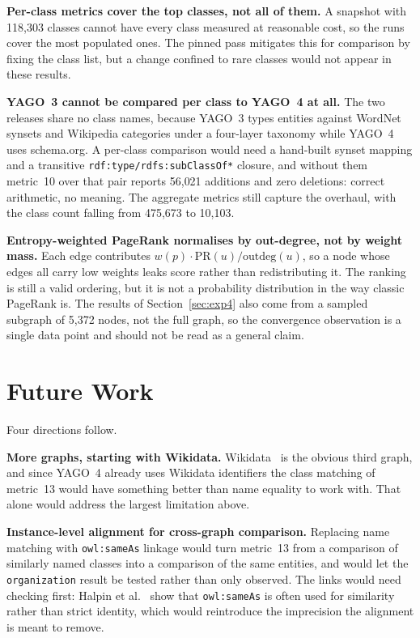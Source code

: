 \textbf{Per-class metrics cover the top classes, not all of them.} A snapshot
with 118{,}303 classes cannot have every class measured at reasonable cost, so
the runs cover the most populated ones. The pinned pass mitigates this for
comparison by fixing the class list, but a change confined to rare classes would
not appear in these results.

\textbf{YAGO~3 cannot be compared per class to YAGO~4 at all.} The two releases
share no class names, because YAGO~3 types entities against WordNet synsets and
Wikipedia categories under a four-layer taxonomy while YAGO~4 uses schema.org. A
per-class comparison would need a hand-built synset mapping and a transitive
\texttt{rdf:type/\allowbreak rdfs:subClassOf*} closure, and without them metric~10 over that
pair reports 56{,}021 additions and zero deletions: correct arithmetic, no
meaning. The aggregate metrics still capture the overhaul, with the class count
falling from 475{,}673 to 10{,}103.

\textbf{Entropy-weighted PageRank normalises by out-degree, not by weight mass.}
Each edge contributes $w(p) \cdot \mathrm{PR}(u) / \mathrm{outdeg}(u)$, so a node
whose edges all carry low weights leaks score rather than redistributing it. The
ranking is still a valid ordering, but it is not a probability distribution in
the way classic PageRank is. The results of Section~\ref{sec:exp4} also come from
a sampled subgraph of 5{,}372 nodes, not the full graph, so the convergence
observation is a single data point and should not be read as a general claim.

\section{Future Work}
\label{sec:future_work}

Four directions follow.

\textbf{More graphs, starting with Wikidata.} Wikidata~\cite{vrandecic2014wikidata}
is the obvious third graph, and since YAGO~4 already uses Wikidata identifiers
the class matching of metric~13 would have something better than name equality
to work with. That alone would address the largest limitation above.

\textbf{Instance-level alignment for cross-graph comparison.} Replacing name
matching with \texttt{owl:sameAs} linkage would turn metric~13 from a comparison
of similarly named classes into a comparison of the same entities, and would let
the \texttt{organization} result be tested rather than only observed. The
links would need checking first: Halpin et al.~\cite{halpin2010sameas} show that
\texttt{owl:sameAs} is often used for similarity rather than strict identity,
which would reintroduce the imprecision the alignment is meant to remove.

